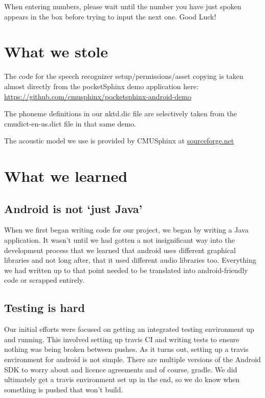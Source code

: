 \documentclass[11pt, oneside]{article}
\begin{document}
When entering numbers, please wait until the number you have just spoken appears
in the box before trying to input the next one.
Good Luck!

\section*{What we stole}

The code for the speech recognizer setup/permissions/asset copying is
taken almost directly from the pocketSphinx demo application here:
\url{https://github.com/cmusphinx/pocketsphinx-android-demo}

The phoneme definitions in our nktd.dic file are selectively taken
from the cmudict-en-us.dict file in that same demo.

The acoustic model we use is provided by CMUSphinx at
\href{https://sourceforge.net/projects/cmusphinx/files/Acoustic\%20and\%20Language\%20Models/US\%20English/}{sourceforge.net}
    
\pagebreak
    
\section*{What we learned}

\subsection*{Android is not `just Java'}

When we first began writing code for our project, we began by writing
a Java application. It wasn't until we had gotten a not insignificant
way into the development process that we learned that android uses
different graphical libraries and not long after, that it used
different audio libraries too. Everything we had written up to that
point needed to be translated into android-friendly code or scrapped
entirely.

\subsection*{Testing is hard}

Our initial efforts were focused on getting an integrated testing
environment up and running. This involved setting up travis CI and
writing tests to ensure nothing was being broken between pushes. As it
turns out, setting up a travis environment for android is not
simple. There are multiple versions of the Android SDK to worry about
and licence agreements and of course, gradle. We did ultimately get a
travis environment set up in the end, so we do know when something is
pushed that won't build.
\end{document}
